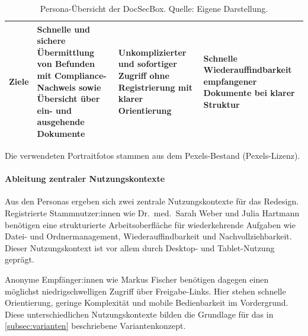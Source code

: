 \begin{table}[h!]
\begin{tabular}{@{}p{2.2cm}p{5.1cm}p{4.7cm}p{4.7cm}@{}}
        Ziele & Schnelle und sichere Übermittlung von Befunden mit Compliance-Nachweis sowie Übersicht über ein- und ausgehende Dokumente & Unkomplizierter und sofortiger Zugriff ohne Registrierung mit klarer Orientierung & Schnelle Wiederauffindbarkeit empfangener Dokumente bei klarer Struktur \\
        \bottomrule
    \end{tabular}
    \caption[Persona-Übersicht]{Persona-Übersicht der DocSecBox. Quelle: Eigene Darstellung.}
    \label{tab:personas_uebersicht}
\end{table}

Die verwendeten Portraitfotos stammen aus dem Pexels-Bestand (Pexels-Lizenz).

\paragraph{Ableitung zentraler Nutzungskontexte}\label{subsec:nutzungskontexte}

Aus den Personas ergeben sich zwei zentrale Nutzungskontexte für das Redesign. Registrierte Stammnutzer:innen wie Dr.~med.~Sarah Weber und Julia Hartmann benötigen eine strukturierte Arbeitsoberfläche für wiederkehrende Aufgaben wie Datei- und Ordnermanagement, Wiederauffindbarkeit und Nachvollziehbarkeit. Dieser Nutzungskontext ist vor allem durch Desktop- und Tablet-Nutzung geprägt.

Anonyme Empfänger:innen wie Markus Fischer benötigen dagegen einen möglichst niedrigschwelligen Zugriff über Freigabe-Links. Hier stehen schnelle Orientierung, geringe Komplexität und mobile Bedienbarkeit im Vordergrund. Diese unterschiedlichen Nutzungskontexte bilden die Grundlage für das in \autoref{subsec:varianten} beschriebene Variantenkonzept.
